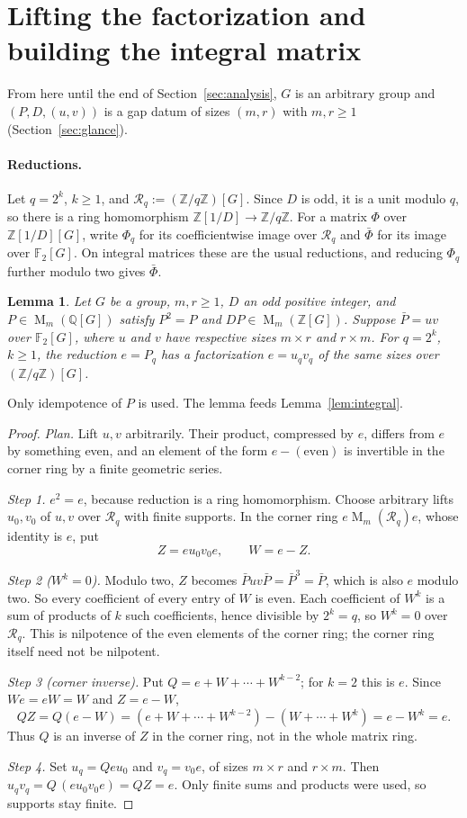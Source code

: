 \documentclass[11pt]{article}
\newtheorem{lemma}[theorem]{Lemma}
\theoremstyle{remark}
\numberwithin{equation}{section}
\newcommand{\F}{\mathbb F}
\newcommand{\Z}{\mathbb Z}
\newcommand{\Q}{\mathbb Q}
\newcommand{\Mat}{\operatorname{M}}
\begin{document}
\section{Lifting the factorization and building the integral matrix}
\label{sec:lifting}

From here until the end of Section~\ref{sec:analysis}, $G$ is an arbitrary group and $(P,D,(u,v))$ is a gap datum of sizes $(m,r)$ with $m,r\ge1$ (Section~\ref{sec:glance}).

\paragraph{Reductions.}
Let $q=2^k$, $k\ge1$, and $\mathcal R_q:=(\Z/q\Z)[G]$. Since $D$ is odd, it is a unit modulo $q$, so there is a ring homomorphism $\Z[1/D]\to\Z/q\Z$. For a matrix $\Phi$ over $\Z[1/D][G]$, write $\Phi_q$ for its coefficientwise image over $\mathcal R_q$ and $\bar\Phi$ for its image over $\F_2[G]$. On integral matrices these are the usual reductions, and reducing $\Phi_q$ further modulo two gives $\bar\Phi$.

\begin{lemma}\label{lem:lift}
Let $G$ be a group, $m,r\ge1$, $D$ an odd positive integer, and
$P\in\Mat_m(\Q[G])$ satisfy $P^2=P$ and
$DP\in\Mat_m(\Z[G])$. Suppose $\bar P=uv$ over $\F_2[G]$, where $u$ and $v$
have respective sizes $m\times r$ and $r\times m$. For $q=2^k$,
$k\ge1$, the reduction $e=P_q$ has a factorization
$e=u_qv_q$ of the same sizes over $(\Z/q\Z)[G]$.
\end{lemma}

Only idempotence of $P$ is used. The lemma feeds Lemma~\ref{lem:integral}.

\begin{proof}
\emph{Plan.} Lift $u,v$ arbitrarily. Their product, compressed by $e$, differs from $e$ by something even, and an element of the form $e-(\text{even})$ is invertible in the corner ring by a finite geometric series.

\emph{Step 1.} $e^2=e$, because reduction is a ring homomorphism. Choose arbitrary lifts $u_0,v_0$ of $u,v$ over $\mathcal R_q$ with finite supports. In the corner ring $e\Mat_m(\mathcal R_q)e$, whose identity is $e$, put
\[
 Z=eu_0v_0e,\qquad W=e-Z.
\]

\emph{Step 2 ($W^k=0$).} Modulo two, $Z$ becomes $\bar Puv\bar P=\bar P^3=\bar P$, which is also $e$ modulo two. So every coefficient of every entry of $W$ is even. Each coefficient of $W^k$ is a sum of products of $k$ such coefficients, hence divisible by $2^k=q$, so $W^k=0$ over $\mathcal R_q$. This is nilpotence of the even elements of the corner ring; the corner ring itself need not be nilpotent.

\emph{Step 3 (corner inverse).} Put $Q=e+W+\cdots+W^{k-2}$; for $k=2$ this is $e$. Since $We=eW=W$ and $Z=e-W$,
\[
 QZ=Q(e-W)=(e+W+\cdots+W^{k-2})-(W+\cdots+W^{k})=e-W^k=e.
\]
Thus $Q$ is an inverse of $Z$ in the corner ring, not in the whole matrix ring.

\emph{Step 4.} Set $u_q=Qeu_0$ and $v_q=v_0e$, of sizes $m\times r$ and $r\times m$. Then $u_qv_q=Q\,(eu_0v_0e)=QZ=e$. Only finite sums and products were used, so supports stay finite.
\end{proof}
\end{document}
